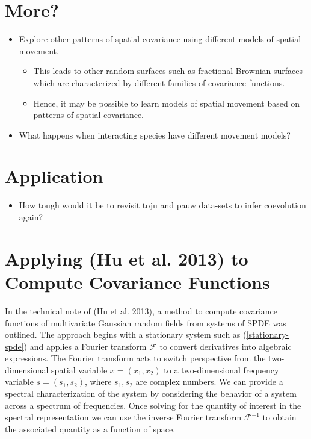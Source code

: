 \documentclass{article}
\begin{document}
\hypertarget{more}{%
\section{More?}\label{more}}

\begin{itemize}
\tightlist
\item
  Explore other patterns of spatial covariance using different models of
  spatial movement.

  \begin{itemize}
  \tightlist
  \item
    This leads to other random surfaces such as fractional Brownian
    surfaces which are characterized by different families of covariance
    functions.
  \item
    Hence, it may be possible to learn models of spatial movement based
    on patterns of spatial covariance.
  \end{itemize}
\item
  What happens when interacting species have different movement models?
\end{itemize}

\hypertarget{application}{%
\section{Application}\label{application}}

\begin{itemize}
\tightlist
\item
  How tough would it be to revisit toju and pauw data-sets to infer
  coevolution again?
\end{itemize}

\newpage

\hypertarget{applying-hu2013multivariate-to-compute-covariance-functions}{%
\section{Applying (Hu et al. 2013) to Compute Covariance
Functions}\label{applying-hu2013multivariate-to-compute-covariance-functions}}

In the technical note of (Hu et al. 2013), a method to compute
covariance functions of multivariate Gaussian random fields from systems
of SPDE was outlined. The approach begins with a stationary system such
as (\ref{stationary-spde}) and applies a Fourier transform
\(\mathcal F\) to convert derivatives into algebraic expressions. The
Fourier transform acts to switch perspective from the two-dimensional
spatial variable \(x=(x_1,x_2)\) to a two-dimensional frequency variable
\(s=(s_1,s_2)\), where \(s_1,s_2\) are complex numbers. We can provide a
spectral characterization of the system by considering the behavior of a
system across a spectrum of frequencies. Once solving for the quantity
of interest in the spectral representation we can use the inverse
Fourier transform \(\mathcal F^{-1}\) to obtain the associated quantity
as a function of space.
\end{document}
